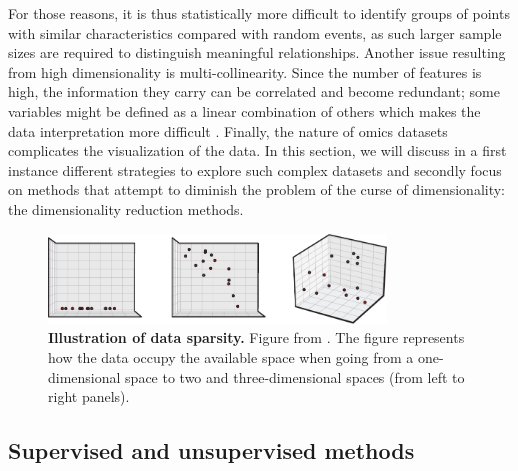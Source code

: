 For those reasons, it is thus statistically more difficult to identify groups of points with similar characteristics compared with random events, as such larger sample sizes are required to distinguish meaningful relationships. Another issue resulting from high dimensionality is multi-collinearity. Since the number of features is high, the information they carry can be correlated and become redundant; some variables might be defined as a linear combination of others which makes the data interpretation more difficult \cite{Altman2018}. 
Finally, the nature of omics datasets complicates the visualization of the data.
In this section, we will discuss in a first instance different strategies to explore such complex datasets and secondly focus on methods that attempt to diminish the problem of the curse of dimensionality: the dimensionality reduction methods.


\begin{figure}[H]
    \centering
    \includegraphics[width=0.8\textwidth]{Figures/Intro/high_dimentionality.pdf}
    \caption[Illustration of data sparsity]{\textbf{Illustration of data sparsity.} Figure from \cite{Ronan2016}. The figure represents how the data occupy the available space when going from a one-dimensional space to two and three-dimensional spaces (from left to right panels). }
    \label{fig:intro_highdim}
\end{figure}

\subsection{Supervised and unsupervised methods}


